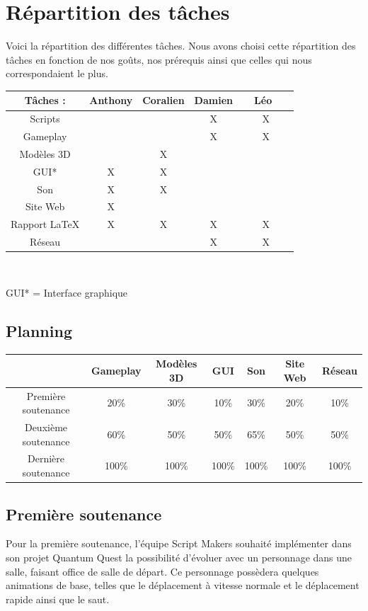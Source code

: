 \documentclass[A4paper,11pt]{article}
\begin{document}
\section{R\'epartition des t\^aches}
Voici la r\'epartition des diff\'erentes t\^aches. Nous avons choisi cette r\'epartition des t\^aches en fonction de nos go\^uts, nos pr\'erequis ainsi que celles qui nous correspondaient le plus.\\
\begin{center}
\begin{tabular}{|c|c|c|c|c|}
\hline
T\^aches : & Anthony & Coralien & Damien & ~~L\'eo~~~\\
\hline
Scripts &   &   & X & X\\
\hline
Gameplay &   &   & X & X\\
\hline
Mod\`eles 3D &   & X &   &  \\
\hline
GUI* & X & X  &  & \\
\hline
Son & X & X &   &  \\
\hline
Site Web & X &   &   &  \\
\hline
Rapport LaTeX & X & X & X & X\\
\hline
R\'eseau & & & X & X\\
\hline
\end{tabular}\\
\end{center}
GUI* = Interface graphique
\begin{center}
\section{Planning}
\begin{tabular}{|c|c|c|c|c|c|c|}
\hline
 & Gameplay & Mod\`eles 3D & GUI & Son & Site Web & R\'eseau\\
\hline
Premi\`ere soutenance & 20\% & 30\% & 10\% & 30\% & 20\% & 10\%\\
\hline
Deuxi\`eme soutenance & 60\% & 50\% & 50\% & 65\% & 50\% & 50\%\\
\hline
Derni\`ere soutenance &100\% & 100\% & 100\% & 100\% & 100\% & 100\%\\
\hline
\end{tabular}
\end{center}
\subsection{Premi\`ere soutenance}
Pour la premi\`ere soutenance, l'\'equipe Script Makers souhait\'e impl\'ementer dans son projet Quantum Quest la possibilit\'e d'\'evoluer avec un personnage dans une salle, faisant office de salle de d\'epart. Ce personnage poss\`edera quelques animations de base, telles que le d\'eplacement \`a vitesse normale et le d\'eplacement rapide ainsi que le saut.\\ 
\end{document}
